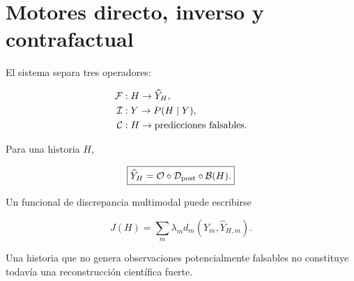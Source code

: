\section{Motores directo, inverso y contrafactual}

El sistema separa tres operadores:

\begin{align}
\mathcal F &: H\rightarrow \widehat Y_H,\\
\mathcal I &: Y\rightarrow P(H\mid Y),\\
\mathcal C &: H\rightarrow \text{predicciones falsables}.
\end{align}

Para una historia \(H\),

\begin{equation}
\boxed{
\widehat Y_H
=
\mathcal O
\circ
\mathcal D_{\mathrm{post}}
\circ
\mathcal B(H).
}
\end{equation}

Un funcional de discrepancia multimodal puede escribirse

\begin{equation}
J(H)
=
\sum_m
\lambda_m
d_m(Y_m,\widehat Y_{H,m}).
\end{equation}

Una historia que no genera observaciones potencialmente falsables no constituye todavía una reconstrucción científica fuerte.
